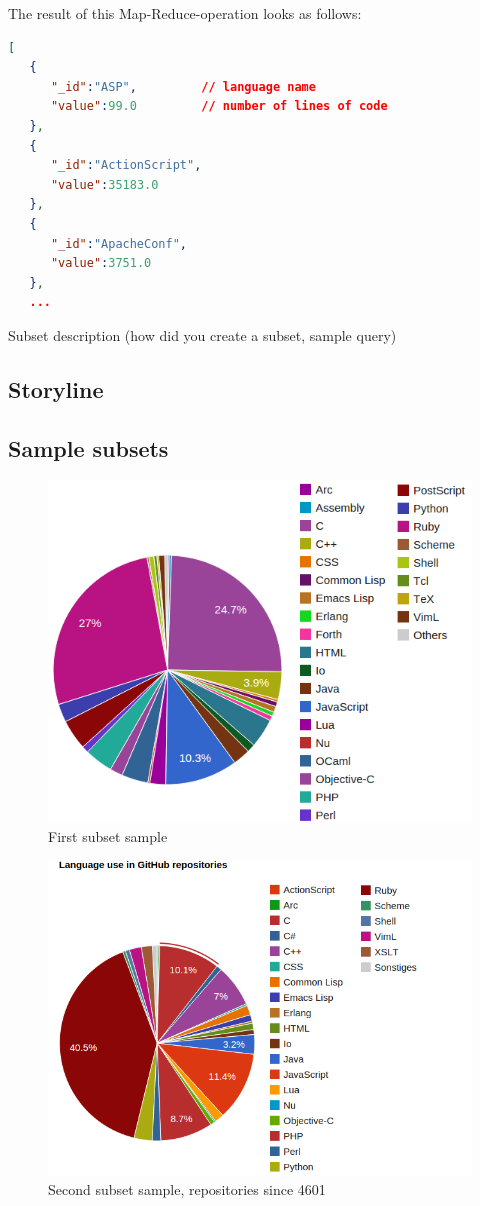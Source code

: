 The result of this Map-Reduce-operation looks as follows:

\begin{lstlisting}[language=json]
[  
   {  
      "_id":"ASP",         // language name
      "value":99.0         // number of lines of code
   },
   {  
      "_id":"ActionScript",
      "value":35183.0
   },
   {  
      "_id":"ApacheConf",
      "value":3751.0
   },
   ...
\end{lstlisting}

Subset description (how did you create a subset, sample query)

\subsection{Storyline}\label{sec:storyline}


\subsection{Sample subsets}\label{sec:sample-subsets}

\begin{figure}[h]
    \centering
    \includegraphics[width=0.8\linewidth]{images/sample1.png}
    \caption{First subset sample}
    \label{fig:sample1}
\end{figure}

\begin{figure}[h]
    \centering
    \includegraphics[width=0.8\linewidth]{images/sample2-since-4601.png}
    \caption{Second subset sample, repositories since 4601}
    \label{fig:sample2}
\end{figure}
